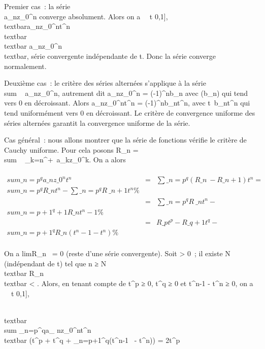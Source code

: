 \documentclass[]{article}
\begin{document}
Premier cas~: la série \\\sum
 a\_nz\_0^n converge absolument. Alors on a
\forall~~t \in {[}0,1{]},
\\textbar{}a\_nz\_0^nt^n\\textbar{}
\leq\\textbar{}
a\_nz\_0^n\\textbar{}, série
convergente indépendante de t. Donc la série converge normalement.

Deuxième cas~: le critère des séries alternées s'applique à la série
\\sum ~
a\_nz\_0^n, autrement dit
a\_nz\_0^n = (-1)^nb\_n avec
(b\_n) qui tend vers 0 en décroissant. Alors
a\_nz\_0^nt^n =
(-1)^nb\_nt^n, avec
t\mapsto~b\_nt^n qui tend
uniformément vers 0 en décroissant. Le critère de convergence uniforme
des séries alternées garantit la convergence uniforme de la série.

Cas général~: nous allons montrer que la série de fonctions vérifie le
critère de Cauchy uniforme. Pour cela posons R\_n
= \\sum ~
\_k=n^+\infty~a\_kz\_0^k. On a alors

\begin{align*} \\sum
\_n=p^qa\_ nz\_0^nt^n&
=& \sum \_n=p^q(R\_ n~ -
R\_n+1)t^n = \\sum
\_n=p^qR\_ nt^n
-\sum \_n=p^qR~\_
n+1t^n\%& \\ & =&
\sum \_n=p^qR~\_
nt^n -\\sum
\_n=p+1^q+1R\_ nt^n-1 \%&
\\ & =& R\_pt^p -
R\_ q+1t^q -\\sum
\_n=p+1^qR\_ n(t^n-1 - t^n)
\%& \\ \end{align*}

On a limR\_n~ = 0 (reste d'une série
convergente). Soit \epsilon \textgreater{} 0~; il existe N \in {}~ (indépendant de
t) tel que n ≥ N \rigtharrow~\\textbar{}
R\_n\\textbar{} \textless{} \epsilon
{} . Alors, en tenant compte de t^p ≥
0, t^q ≥ 0 et t^n-1 - t^n ≥ 0, on a
\forall~~t \in {[}0,1{]},

\\textbar{}\\sum
\_n=p^qa\_
nz\_0^nt^n\\textbar{} \leq \epsilon
{} (t^p + t^q +
\sum \_n=p+1^q(t^n-1~ -
t^n)) = 2t^p \epsilon {} \leq \epsilon
\end{document}
